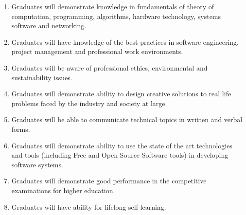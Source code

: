 \documentclass[a4paper]{article}
\begin{document}
\begin{enumerate}

\item Graduates will demonstrate knowledge in fundamentals of theory of computation, programming, algorithms, hardware technology, systems software and networking.

\item Graduates will have knowledge of the best practices in software engineering, project management and professional work environments.

\item Graduates will be aware of professional ethics, environmental and sustainability issues.

\item Graduates will demonstrate ability to design creative solutions to real life problems faced by the industry and society at large.

\item Graduates will be able to communicate technical topics in written and verbal forms.

\item Graduates will demonstrate ability to use the state of the art technologies and tools (including Free and Open Source Software tools) in developing software systems.

\item Graduates will demonstrate good performance in the competitive examinations for higher education.

\item Graduates will have ability for lifelong self-learning.

\end{enumerate} 
\end{document}
